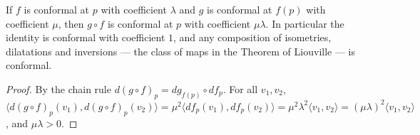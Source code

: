 \begin{lemma}
  \label{lem:dc-ch8-5-conformal-comp}
  \leanok
  If $f$ is conformal at $p$ with coefficient $\lambda$ and $g$ is conformal at
  $f(p)$ with coefficient $\mu$, then $g\circ f$ is conformal at $p$ with
  coefficient $\mu\lambda$. In particular the identity is conformal with
  coefficient $1$, and any composition of isometries, dilatations and inversions —
  the class of maps in the Theorem of Liouville — is conformal.
\end{lemma}
\begin{proof}
  \leanok
  By the chain rule $d(g\circ f)_p=dg_{f(p)}\circ df_p$. For all $v_1,v_2$,
  $\langle d(g\circ f)_p(v_1),d(g\circ f)_p(v_2)\rangle
  =\mu^2\langle df_p(v_1),df_p(v_2)\rangle
  =\mu^2\lambda^2\langle v_1,v_2\rangle=(\mu\lambda)^2\langle v_1,v_2\rangle$,
  and $\mu\lambda>0$.
\end{proof}

